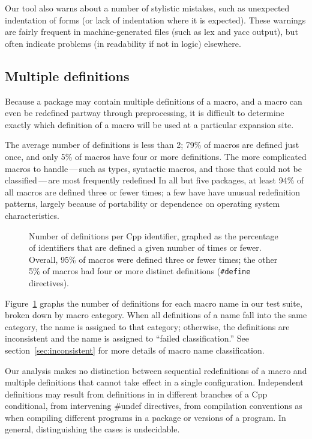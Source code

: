 \documentclass[10pt]{article}
\begin{document}
Our tool also warns about a number of stylistic mistakes, such as
unexpected indentation of forms (or lack of indentation where it is
expected).  These warnings are fairly frequent in machine-generated files
(such as lex and yacc output), but often indicate problems (in readability
if not in logic) elsewhere.


\subsection{Multiple definitions}
\label{sec:mult-def}

Because a package may contain multiple definitions of a macro, and a macro
can even be redefined partway through preprocessing, it is difficult to
determine exactly which definition of a macro will be used at a particular
expansion site.

The average number of definitions is less than 2; 79\% of macros are
defined just once, and only 5\% of macros have four or more definitions.
The more complicated macros to handle\,---\,such as types, syntactic
macros, and those that could not be classified\,---\,are most frequently
redefined In all but five packages, at least 94\% of all macros are defined
three or fewer times; a few have have unusual redefinition patterns,
largely because of portability or dependence on operating system
characteristics.


\begin{figure}
\centerline{}
\caption{Number of definitions per Cpp identifier, graphed as
  the percentage of identifiers that are defined a given number of times
  or fewer.  Overall, 95\% of macros were defined three or
  fewer times; the other 5\% of macros had four or more distinct
  definitions ({\tt \#define} directives).}
\label{fig:freq-def-cat}
\end{figure}

Figure~\ref{fig:freq-def-cat} graphs the number of definitions for each
macro name in our test suite, broken down by macro category.  When all
definitions of a name fall into the same category, the name is assigned to
that category; otherwise, the definitions are inconsistent and the name is
assigned to ``failed classification.''  See section~\ref{sec:inconsistent}
for more details of macro name classification.

Our analysis makes no distinction between sequential redefinitions of a
macro and multiple definitions that cannot take effect in a single
configuration.  Independent definitions may result from definitions in in
different branches of a Cpp conditional, from intervening {\#undef}
directives, from compilation conventions as when compiling different
programs in a package or versions of a program.  In general, distinguishing
the cases is undecidable.
\end{document}
